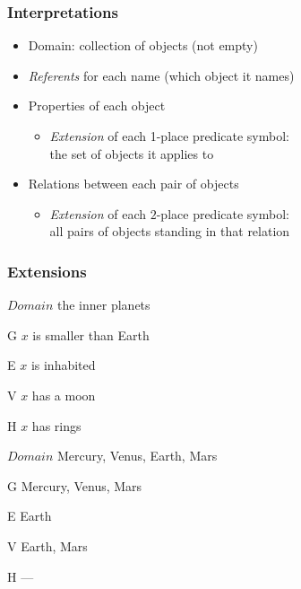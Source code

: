 \begin{frame}
\frametitle{Interpretations}

\begin{itemize}[<+->]
\item Domain: collection of objects (not empty)
\item \emph{Referents} for each name (which object it names)
\item Properties of each object
  \begin{itemize}
  \item \emph{Extension} of each 1-place predicate symbol: \\  the set of objects it applies to
  \end{itemize}
  \bigskip
\item Relations between each pair of objects
\begin{itemize}
\item \emph{Extension} of each $2$-place predicate symbol: \\  all pairs of
  objects standing in that relation
\end{itemize}
\end{itemize}

\end{frame}

\begin{frame}
\frametitle{Extensions}

\begin{ekey}
  \item[$Domain$] the inner planets
  \item[G\qv{x}] $x$ is smaller than Earth
  \item[E\qv{x}] $x$ is inhabited
  \item[V\qv{x}] $x$ has a moon
  \item[H\qv{x}] $x$ has rings
\end{ekey}

\begin{ekey}
\item[$Domain$] Mercury, Venus, Earth, Mars
\item[G\qv{x}] Mercury, Venus, Mars
\item[E\qv{x}] Earth
\item[V\qv{x}] Earth, Mars
\item[H\qv{x}] ---
\end{ekey}
\end{frame}

